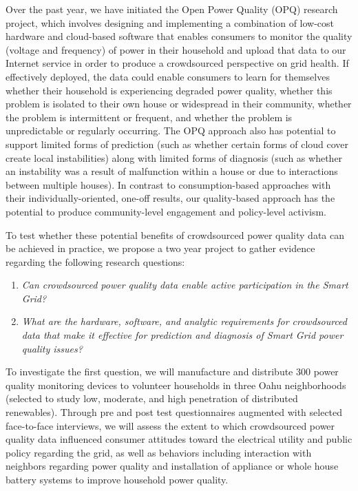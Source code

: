 Over the past year, we have initiated the Open Power Quality (OPQ) research project, which involves designing and implementing a combination of low-cost hardware and cloud-based software that enables consumers to monitor the quality (voltage and frequency) of power in their household and upload that data to our Internet service in order to produce a crowdsourced perspective on grid health.  If effectively deployed, the data could enable consumers to learn for themselves whether their household is experiencing degraded power quality, whether this problem is isolated to their own house or widespread in their community, whether the problem is intermittent or frequent, and whether the problem is unpredictable or regularly occurring. The OPQ approach also has potential to support limited forms of prediction (such as whether certain forms of cloud cover create local instabilities) along with limited forms of diagnosis (such as whether an instability was a result of malfunction within a house or due to interactions between multiple houses).   In contrast to consumption-based approaches with their individually-oriented, one-off results, our quality-based approach has the potential to produce community-level engagement and policy-level activism.  

To test whether these potential benefits of crowdsourced power quality data can be achieved in practice, we propose a two year project to gather evidence regarding the following research questions:

\begin{enumerate}

\item {\em Can crowdsourced power quality data enable active participation in the Smart Grid?}

\item {\em What are the hardware, software, and analytic requirements for crowdsourced data that make it effective for prediction and diagnosis of Smart Grid power quality issues?}

\end{enumerate}

To investigate the first question, we will manufacture and distribute 300 power quality monitoring devices to volunteer households in three Oahu neighborhoods (selected to study low, moderate, and high penetration of distributed renewables). Through pre and post test questionnaires augmented with selected face-to-face interviews, we will assess the extent to which crowdsourced power quality data influenced 
consumer attitudes toward the electrical utility and public policy regarding the grid, as well as behaviors including interaction with neighbors regarding power quality and installation of appliance or whole house battery systems to improve household power quality.


